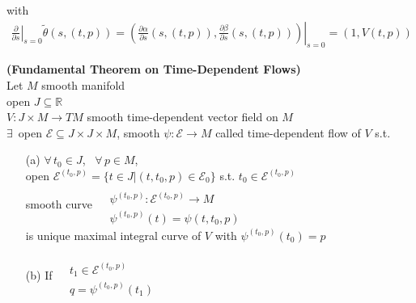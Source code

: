 with \[
\begin{gathered}
\left. \frac{ \partial }{ \partial s}\right|_{s=0} \widetilde{\theta}( s,(t,p)) = \left. \left( \frac{ \partial \alpha }{\partial s}(s,(t,p)), \frac{\partial \beta}{ \partial s}(s,(t,p))  \right)\right|_{s=0} = (1, V(t,p))
\end{gathered}
\]


\begin{theorem}[9.48] \textbf{(Fundamental Theorem on Time-Dependent Flows)} \\
Let $M$ smooth manifold \\
open $J \subseteq \mathbb{R}$ \\
$V: J \times M \to TM$ smooth time-dependent vector field on $M$ \\
$\exists \, $ open $\mathcal{E} \subseteq J\times J \times M$, smooth $\psi : \mathcal{E} \to M$ called time-dependent flow of $V$ s.t. 

\begin{enumerate}
\item[(a)] $\forall \, t_0 \in J$, \, $\forall \, p \in M$, \\
open $\mathcal{E}^{(t_0,p)} = \lbrace t \in J | (t,t_0, p) \in \mathcal{E}_0 \rbrace$ s.t. $t_0 \in \mathcal{E}^{(t_0, p)}$ \\
smooth curve $\begin{aligned}
  & \quad \\ 
  & \psi^{(t_0,p)}: \mathcal{E}^{(t_0,p)} \to M \\
  & \psi^{(t_0,p)}(t) = \psi(t,t_0,p) \end{aligned}$ \\
is unique maximal integral curve of $V$ with $\psi^{(t_0,p)}(t_0) = p$
\item[(b)] If $ \begin{aligned}
  & \quad \\ 
  & t_1 \in \mathcal{E}^{(t_0,p)} \\
  & q = \psi^{(t_0,p)}(t_1) \end{aligned}$


\end{enumerate}
\end{theorem}

